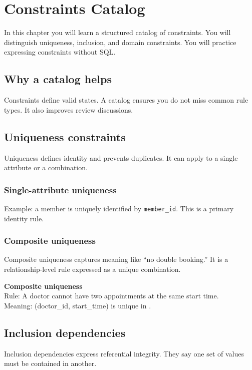 \chapter{Constraints Catalog}

\begin{learningobjectives}
In this chapter you will learn a structured catalog of constraints.
You will distinguish uniqueness, inclusion, and domain constraints.
You will practice expressing constraints without SQL.
\end{learningobjectives}

\section{Why a catalog helps}
Constraints define valid states.
A catalog ensures you do not miss common rule types.
It also improves review discussions.

\section{Uniqueness constraints}
Uniqueness defines identity and prevents duplicates.
It can apply to a single attribute or a combination.

\subsection{Single-attribute uniqueness}
Example: a member is uniquely identified by \texttt{member\_id}.
This is a primary identity rule.

\subsection{Composite uniqueness}
Composite uniqueness captures meaning like “no double booking.”
It is a relationship-level rule expressed as a unique combination.

\begin{examplebox}
\textbf{Composite uniqueness}\\
Rule: A doctor cannot have two appointments at the same start time.\\
Meaning: (doctor\_id, start\_time) is unique in .
\end{examplebox}

\section{Inclusion dependencies}
Inclusion dependencies express referential integrity.
They say one set of values must be contained in another.


